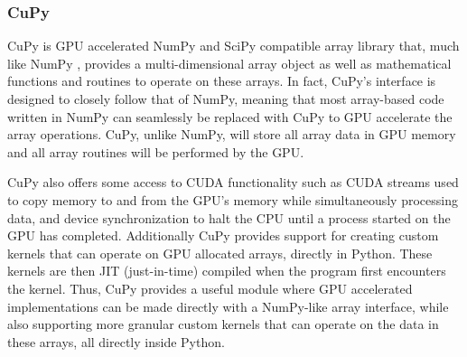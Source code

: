 \subsubsection{CuPy} \label{background:implementation_tools_and_libraries:cupy}
CuPy is GPU accelerated NumPy \cite{numpy} and SciPy \cite{scipy} compatible array library that, much like NumPy \cite{numpy}, provides a multi-dimensional array object as well as mathematical functions and routines to operate on these arrays.
In fact, CuPy's interface is designed to closely follow that of NumPy, meaning that most array-based code written in NumPy can seamlessly be replaced with CuPy to GPU accelerate the array operations.
CuPy, unlike NumPy, will store all array data in GPU memory and all array routines will be performed by the GPU.

CuPy also offers some access to CUDA functionality such as CUDA streams used to copy memory to and from the GPU's memory while simultaneously processing data, and device synchronization to halt the CPU until a process started on the GPU has completed.
Additionally CuPy provides support for creating custom kernels that can operate on GPU allocated arrays, directly in Python.
These kernels are then JIT (just-in-time) compiled when the program first encounters the kernel.
Thus, CuPy provides a useful module where GPU accelerated implementations can be made directly with a NumPy-like array interface, while also supporting more granular custom kernels that can operate on the data in these arrays, all directly inside Python.
